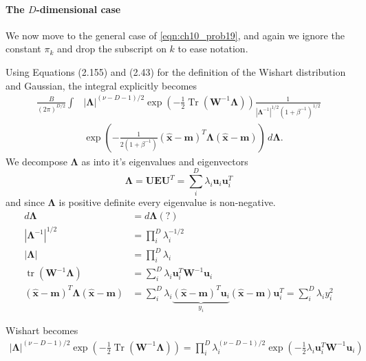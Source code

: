 \documentclass[12pt, a4paper]{article}
\newcommand{\vect}[1]{\bm{#1}}
\newcommand{\abs}[1]{\left\lvert#1\right\rvert}
\begin{document}
\paragraph{The $D$-dimensional case}
We now move to the general case of \eqref{eqn:ch10_prob19}, and again we ignore the constant $\pi_k$ and drop the subscript on $k$ to ease notation.

Using Equations (2.155) and (2.43) for the definition of the Wishart distribution and Gaussian, the integral explicitly becomes
\begin{align*}
\frac{B}{(2 \pi)^{D/2}}
	\int &  \abs{\vect{\Lambda}}^{(\nu - D - 1)/2}
	\exp \left( - \frac{1}{2} \operatorname{Tr} (\vect{W}^{-1} \vect{\Lambda}) \right)
	\frac{1}{\abs{\vect{\Lambda}^{-1}}^{1/2} (1 + \beta^{-1})^{1/2}} \\
	& \exp \left( 
	- \frac{1}{2 (1 + \beta^{-1})} ( \widehat{\vect{x}} - \vect{m} )^T
	  \vect{\Lambda} 
	 ( \widehat{\vect{x}} - \vect{m} )  \right)
	 \, d \vect{\Lambda}.
\end{align*}
We decompose $\vect{\Lambda}$ as into it's eigenvalues and eigenvectors
\begin{equation*}
	\vect{\Lambda} = \vect{U} \vect{E} \vect{U}^T
	= \sum_i^D \lambda_i \vect{u}_i \vect{u}_i^T
\end{equation*}
and since $\vect{\Lambda}$ is positive definite every eigenvalue is non-negative.
\begin{align*}
	d \vect{\Lambda} &= d \vect{\Lambda} (?) \\
	\abs{\vect{\Lambda}^{-1}}^{1/2} &= \prod_{i}^{D} \lambda_i^{-1/2} \\
	\abs{\vect{\Lambda}} &= \prod_{i}^{D} \lambda_i  \\
	\operatorname{tr}\left( \vect{W}^{-1} \vect{\Lambda} \right) &= \sum_i^D \lambda_i \vect{u}_i^T \vect{W}^{-1} \vect{u}_i  \\
	( \widehat{\vect{x}} - \vect{m} )^T
	\vect{\Lambda} 
	( \widehat{\vect{x}} - \vect{m} )
	&= 
	\sum_i^D \lambda_i
	\underbrace{( \widehat{\vect{x}} - \vect{m} )^T
		\vect{u}_i}_{y_i}
	( \widehat{\vect{x}} - \vect{m} )
	\vect{u}_i^T
	= \sum_i^D \lambda_i y_i^2
\end{align*}

Wishart becomes
\begin{align*}
  \abs{\vect{\Lambda}}^{(\nu - D - 1)/2}
\exp \left( - \frac{1}{2} \operatorname{Tr} (\vect{W}^{-1} \vect{\Lambda}) \right) 
=
\prod_{i}^{D} \lambda_i^{(\nu - D - 1)/2}
\exp \left( - \frac{1}{2} \lambda_i \vect{u}_i^T \vect{W}^{-1} \vect{u}_i \right)
\end{align*}
\end{document}
